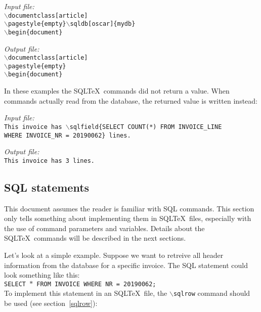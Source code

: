 \documentclass{article}
\newcommand{\bs}{\ensuremath{\backslash}}
\newcommand{\vs}{\vspace{3mm}}
\begin{document}
\begin{minipage}[t]{0.5\textwidth}\textsl{Input file:}\\\texttt{\footnotesize{\bs documentclass[article] \\
\bs pagestyle\{empty\}\bs sqldb[oscar]\{mydb\} \\
\bs begin\{document\} \\
\hrulefill}}\end{minipage}\hfill\begin{minipage}[t]{0.5\textwidth}\textsl{Output file:}\\\texttt{\footnotesize{\bs documentclass[article] \\
\bs pagestyle\{empty\} \\
\bs begin\{document\} \\
}}\end{minipage}

\vs

In these examples the SQL\TeX\ commands did not return a value. When commands actually read from
the database, the returned value is written instead:

\vs

\begin{minipage}[t]{0.5\textwidth}\textsl{Input file:}\\\texttt{\footnotesize{This invoice has \bs sqlfield\{SELECT COUNT(*) FROM INVOICE\_LINE \\
WHERE INVOICE\_NR = 20190062\} lines.\\
\hrulefill}}\end{minipage}\hfill\begin{minipage}[t]{0.5\textwidth}\textsl{Output file:}\\\texttt{\footnotesize{This invoice has 3 lines. \\
}}\end{minipage}

\subsection{SQL statements}\label{sqlstatements}

This document assumes the reader is familiar with SQL commands. This section only tells something about
implementing them in SQL\TeX\ files, especially with the use of command parameters and variables.
Details about the SQL\TeX\ commands will be described in the next sections.

\vs

Let's look at a simple example. Suppose we want to retreive all header information from the database
for a specific invoice. The SQL statement could look something like this: \\
\texttt{SELECT $\ast$ FROM INVOICE WHERE NR = 20190062;}\\
To implement this statement in an SQL\TeX\ file, the \texttt{\bs sqlrow} command should be used (see
section~\ref{sqlrow}):
\end{document}
